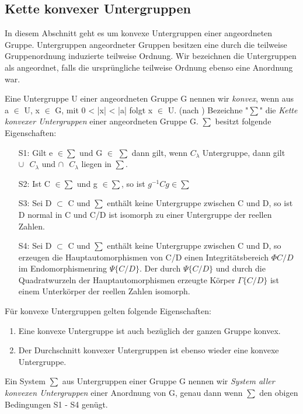 \subsection{Kette konvexer Untergruppen}
In diesem Abschnitt geht es um konvexe Untergruppen einer angeordneten Gruppe. Untergruppen angeordneter Gruppen besitzen eine durch die teilweise Gruppenordnung induzierte teilweise Ordnung. Wir bezeichnen die Untergruppen als angeordnet, falls die ursprüngliche teilweise Ordnung ebenso eine Anordnung war.
\begin{defn}
Eine Untergruppe U einer angeordneten Gruppe G nennen wir \textit{konvex}, wenn aus a $\in$ U, x $\in$ G, mit 0 < |x| < |a| folgt x $\in$ U. (nach \cite{priesscrampe69})
Bezeichne "$\sum$"  die \textit{Kette konvexer Untergruppen} einer angeordneten Gruppe G. $\sum$ besitzt folgende Eigenschaften:
\begin{enumerate}
\item[S1:] Gilt e $\in \sum$ und G $\in$ $\sum$ dann gilt, wenn $C_\lambda$ Untergruppe, dann gilt $\cup \text{ }C_\lambda$ und $\cap \text{ } C_\lambda$ liegen in $\sum$.
\item[S2:] Ist C $\in\sum$ und g $\in\sum$, so ist $g^{-1}Cg\in\sum$
\item[S3:] Sei D $\subset$ C und $\sum$ enthält keine Untergruppe zwischen C und D, so ist D normal in C und C/D ist isomorph zu einer Untergruppe der reellen Zahlen.
\item[S4:] Sei D $\subset$ C und $\sum$ enthält keine Untergruppe zwischen C und D, so erzeugen die Hauptautomorphismen von C/D einen Integritätsbereich $\Phi{C/D}$ im Endomorphismenring $\Psi\lbrace C/D \rbrace$. Der durch $\Psi\lbrace C/D\rbrace$ und durch die Quadratwurzeln der Hauptautomorphismen erzeugte Körper $\Gamma\lbrace C/D\rbrace$ ist einem Unterkörper der reellen Zahlen isomorph.
\end{enumerate}
\end{defn}
%
\begin{bem}
Für konvexe Untergruppen gelten folgende Eigenschaften:
\begin{enumerate}
\item Eine konvexe Untergruppe ist auch bezüglich der ganzen Gruppe konvex.
\item Der Durchschnitt konvexer Untergruppen ist ebenso wieder eine konvexe Untergruppe.
\end{enumerate}
\end{bem}
\begin{defn}\label{SkUgr}  
Ein System $\sum$ aus Untergruppen einer Gruppe G nennen wir \textit{System aller konvexen Untergruppen} einer Anordnung von G, genau dann wenn $\sum$ den obigen Bedingungen S1 - S4 genügt. \cite{malzew48}
\end{defn}
%
%
